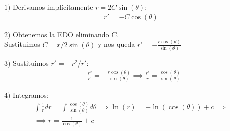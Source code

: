 \documentclass[nochap]{apuntes}
\begin{document}
\begin{problem}[11]
\spart
$1)$ Derivamos implícitamente $r=2C\sin(\theta)$:
\begin{gather*}
r'=-C\cos(\theta)
\end{gather*}

$2)$ Obtenemos la EDO eliminando C.\\
Sustituimos $C=r/2\sin(\theta)$ y nos queda $r'=-\frac{r\cos(\theta)}{\sin(\theta)}$

$3)$ Sustituimos  $r'=-r^2/r'$:
\begin{gather*}
-\frac{r^2}{r'}=-\frac{r\cos(\theta)}{\sin(\theta)} \implies \frac{r'}{r}=\frac{\cos(\theta)}{\sin(\theta)}
\end{gather*}

$4)$ Integramos:
\begin{gather*}
\int \frac{1}{r}dr=\int\frac{\cos(\theta)}{\sin(\theta)}d\theta \implies \ln(r)=-\ln(\cos(\theta))+c \implies \\ \implies r=\frac{1}{\cos(\theta)}+c
\end{gather*}

\end{problem}
\newpage
\end{document}
